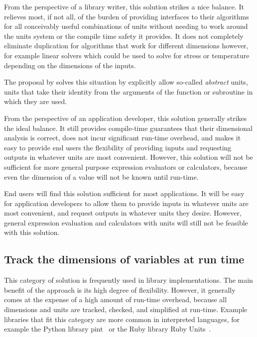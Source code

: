 \documentclass{article}
\begin{document}
From the perspective of a library writer, this solution strikes a nice balance.
It relieves most, if not all, of the burden of providing interfaces to their algorithms for all conceivably useful combinations of units without needing to work around the units system or the compile time safety it provides.
It does not completely eliminate duplication for algorithms that work for different dimensions however,
for example linear solvers which could be used to solve for stress or temperature depending on the dimensions of the inputs.

The proposal by \cite{UnitsOfMeasureFortran} solves this situation by explicitly allow so-called \emph{abstract}
units, units that take their identity from the arguments of the function or subroutine in which they are used.

From the perspective of an application developer, this solution generally strikes the ideal balance.
It still provides compile-time guarantees that their dimensional analysis is correct,
does not incur significant run-time overhead,
and makes it easy to provide end users the flexibility of providing inputs and requesting outputs in whatever units are most convenient.
However, this solution will not be sufficient for more general purpose expression evaluators or calculators,
because even the dimension of a value will not be known until run-time.

End users will find this solution sufficient for most applications.
It will be easy for application developers to allow them to provide inputs in whatever units are most convenient,
and request outputs in whatever units they desire.
However, general expression evaluation and calculators with units will still not be feasible with this solution.

\subsection{Track the dimensions of variables at run time}
\label{dynamic-dimensions}

This category of solution is frequently used in library implementations.
The main benefit of the approach is its high degree of flexibility.
However, it generally comes at the expense of a high amount of run-time overhead,
because all dimensions and units are tracked, checked, and simplified at run-time.
Example libraries that fit this category are more common in interpreted languages,
for example the Python library pint~\cite{Grecco2021} or the Ruby library Ruby Units~\cite{Olbrich2021}.
\end{document}

